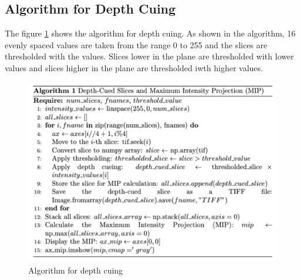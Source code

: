 \documentclass{article}
\begin{document}
\subsection*{Algorithm for Depth Cuing}
The figure \ref{fig:depth-cuing} shows the algorithm for depth cuing. As shown in the algorithm, 16 evenly spaced values are taken from the range 0 to 255 and the slices are thresholded with the values. Slices lower in the plane are thresholded with lower values and slices higher in the plane are thresholded iwth higher values. %
\begin{figure}[h!]
    \centering
    \includegraphics[width=0.8\linewidth]{Report/Images/depth_cuing.png}
    \caption{Algorithm for depth cuing }
    \label{fig:depth-cuing}
\end{figure}
\end{document}
